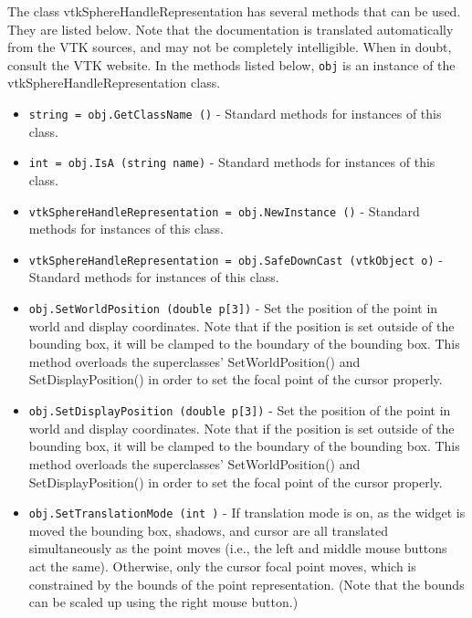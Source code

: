 The class vtkSphereHandleRepresentation has several methods that can be used.
  They are listed below.
Note that the documentation is translated automatically from the VTK sources,
and may not be completely intelligible.  When in doubt, consult the VTK website.
In the methods listed below, \verb|obj| is an instance of the vtkSphereHandleRepresentation class.
\begin{itemize}
\item  \verb|string = obj.GetClassName ()| -  Standard methods for instances of this class.

\item  \verb|int = obj.IsA (string name)| -  Standard methods for instances of this class.

\item  \verb|vtkSphereHandleRepresentation = obj.NewInstance ()| -  Standard methods for instances of this class.

\item  \verb|vtkSphereHandleRepresentation = obj.SafeDownCast (vtkObject o)| -  Standard methods for instances of this class.

\item  \verb|obj.SetWorldPosition (double p[3])| -  Set the position of the point in world and display coordinates. Note 
 that if the position is set outside of the bounding box, it will be 
 clamped to the boundary of the bounding box. This method overloads
 the superclasses' SetWorldPosition() and SetDisplayPosition() in 
 order to set the focal point of the cursor properly.

\item  \verb|obj.SetDisplayPosition (double p[3])| -  Set the position of the point in world and display coordinates. Note 
 that if the position is set outside of the bounding box, it will be 
 clamped to the boundary of the bounding box. This method overloads
 the superclasses' SetWorldPosition() and SetDisplayPosition() in 
 order to set the focal point of the cursor properly.

\item  \verb|obj.SetTranslationMode (int )| -  If translation mode is on, as the widget is moved the bounding box,
 shadows, and cursor are all translated simultaneously as the point moves
 (i.e., the left and middle mouse buttons act the same).  Otherwise, only
 the cursor focal point moves, which is constrained by the bounds of the
 point representation. (Note that the bounds can be scaled up using the
 right mouse button.)


\end{itemize}
